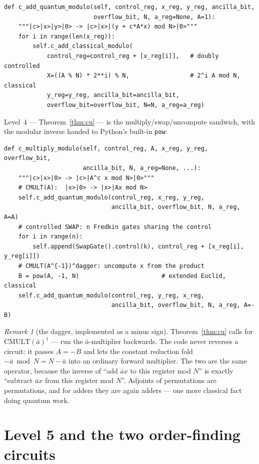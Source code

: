 \documentclass[11pt]{article}
\newcommand{\CMULT}{\mathrm{CMULT}}
\newcommand{\code}[1]{\texttt{#1}}
\theoremstyle{plain}
\theoremstyle{remark}
\newtheorem*{remark}{Remark}
\begin{document}
\begin{lstlisting}
def c_add_quantum_modulo(self, control_reg, x_reg, y_reg, ancilla_bit,
                         overflow_bit, N, a_reg=None, A=1):
    """|c>|x>|y>|0> -> |c>|x>|(y + c*A*x) mod N>|0>"""
    for i in range(len(x_reg)):
        self.c_add_classical_modulo(
            control_reg=control_reg + [x_reg[i]],   # doubly controlled
            X=((A % N) * 2**i) % N,                 # 2^i A mod N, classical
            y_reg=y_reg, ancilla_bit=ancilla_bit,
            overflow_bit=overflow_bit, N=N, a_reg=a_reg)
\end{lstlisting}

\noindent
Level~4 --- Theorem~\ref{thm:cu} --- is the multiply/swap/uncompute sandwich, with the modular
inverse handed to Python's built-in \code{pow}:

\begin{lstlisting}
def c_multiply_modulo(self, control_reg, A, x_reg, y_reg, overflow_bit,
                      ancilla_bit, N, a_reg=None, ...):
    """|c>|x>|0> -> |c>|A^c x mod N>|0>"""
    # CMULT(A):  |x>|0> -> |x>|Ax mod N>
    self.c_add_quantum_modulo(control_reg, x_reg, y_reg,
                              ancilla_bit, overflow_bit, N, a_reg, A=A)
    # controlled SWAP: n Fredkin gates sharing the control
    for i in range(n):
        self.append(SwapGate().control(k), control_reg + [x_reg[i], y_reg[i]])
    # CMULT(A^{-1})^dagger: uncompute x from the product
    B = pow(A, -1, N)                       # extended Euclid, classical
    self.c_add_quantum_modulo(control_reg, y_reg, x_reg,
                              ancilla_bit, overflow_bit, N, a_reg, A=-B)
\end{lstlisting}

\begin{remark}[the dagger, implemented as a minus sign]
Theorem~\ref{thm:cu} calls for $\CMULT(\bar a)^\dagger$ --- run the $\bar a$-multiplier backwards.
The code never reverses a circuit: it passes $A=-B$ and lets the constant reduction fold
$-\bar a\bmod N=N-\bar a$ into an ordinary forward multiplier. The two are the same operator,
because the inverse of ``add $\bar ax$ to this register mod $N$'' is exactly ``subtract
$\bar ax$ from this register mod $N$''. Adjoints of permutations are permutations, and for adders
they are again adders --- one more classical fact doing quantum work.
\end{remark}

\section{Level 5 and the two order-finding circuits}\label{sec:code-l5}
\end{document}
